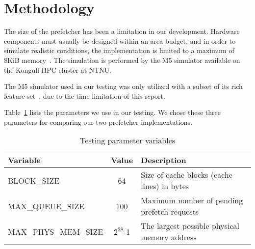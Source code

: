 \section{Methodology}

The size of the prefetcher has been a limitation in our development. Hardware
components must usually be designed within an area budget, and in order to
simulate realistic conditions, the implementation is limited to a maximum of
8KiB memory~\cite{guidelines}. The simulation is performed by the M5 simulator
available on the Kongull HPC cluster at NTNU.

The M5 simulator used in our testing was only utilized with a subset of its rich
feature set~\cite{user_doc}, due to the time limitation of this report.


Table~\ref{tab:test-params} lists the parameters we use in our testing. We chose
these three parameters for comparing our two prefetcher implementations.

\begin{table}[h]
	\caption{Testing parameter variables}
	\begin{tabularx}{\linewidth}{|X|c|X|}
	\hline
	Variable & Value & Description \\
	\hline
	BLOCK\_SIZE & 64 & Size of cache blocks (cache lines) in bytes \\
	\hline
	MAX\_QUEUE\_SIZE & 100 & Maximum number of pending prefetch requests \\
	\hline
	MAX\_PHYS\_MEM\_SIZE & $2^{28}$-1 & The largest possible physical memory address \\
	\hline
	\end{tabularx}
	\label{tab:test-params}
\end{table}

